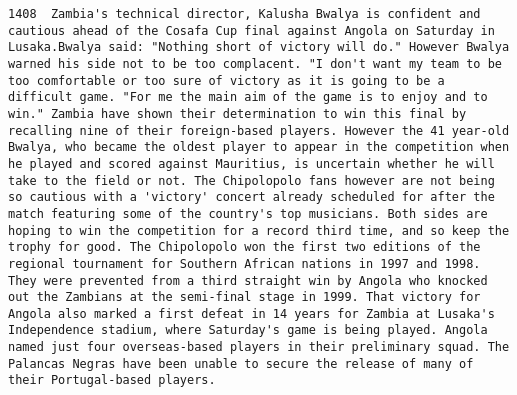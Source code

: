 \documentclass[11pt]{article}
\begin{document}
\begin{Verbatim}[commandchars=\\\{\}]
         1408  Zambia's technical director, Kalusha Bwalya is confident and cautious ahead of the Cosafa Cup final against Angola on Saturday in Lusaka.Bwalya said: "Nothing short of victory will do." However Bwalya warned his side not to be too complacent. "I don't want my team to be too comfortable or too sure of victory as it is going to be a difficult game. "For me the main aim of the game is to enjoy and to win." Zambia have shown their determination to win this final by recalling nine of their foreign-based players. However the 41 year-old Bwalya, who became the oldest player to appear in the competition when he played and scored against Mauritius, is uncertain whether he will take to the field or not. The Chipolopolo fans however are not being so cautious with a 'victory' concert already scheduled for after the match featuring some of the country's top musicians. Both sides are hoping to win the competition for a record third time, and so keep the trophy for good. The Chipolopolo won the first two editions of the regional tournament for Southern African nations in 1997 and 1998. They were prevented from a third straight win by Angola who knocked out the Zambians at the semi-final stage in 1999. That victory for Angola also marked a first defeat in 14 years for Zambia at Lusaka's Independence stadium, where Saturday's game is being played. Angola named just four overseas-based players in their preliminary squad. The Palancas Negras have been unable to secure the release of many of their Portugal-based players.                                                                                                                                                                                                                                                                                                                                                                                                                                                                                                                                                                                                                                                                                                                                                                                                                                                                                                                                                                                                                                                                                                                                                                                                                                                                                                                                                                                                                                                                                                                                                                                                                                                                                                                                                                                                                             
\end{Verbatim}
\end{document}
